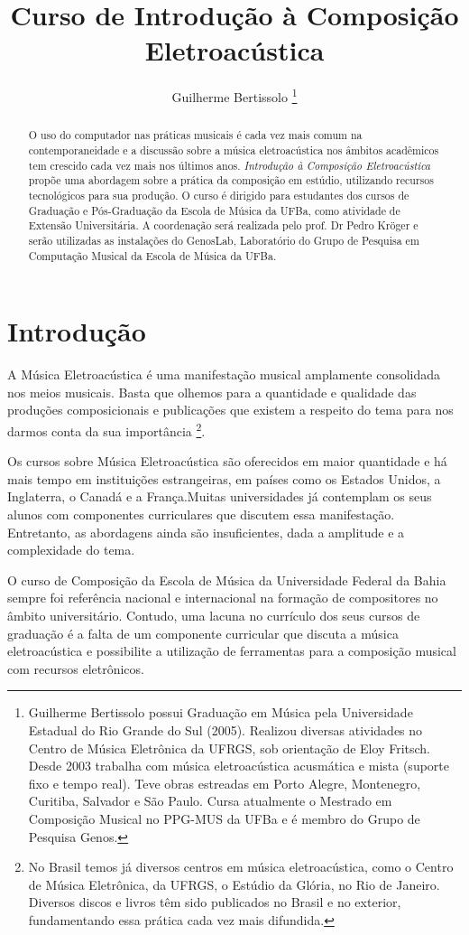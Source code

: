 \documentclass[12pt]{article}
\title{Curso de Introdução à Composição Eletroacústica}
\author{Guilherme Bertissolo \footnote{Guilherme Bertissolo possui Graduação em Música pela Universidade
Estadual do Rio Grande do Sul (2005). Realizou diversas atividades no
Centro de Música Eletrônica da UFRGS, sob orientação de Eloy
Fritsch. Desde 2003 trabalha com música eletroacústica acusmática e
mista (suporte fixo e tempo real). Teve obras estreadas em Porto
Alegre, Montenegro, Curitiba, Salvador e São Paulo. Cursa atualmente o
Mestrado em Composição Musical no PPG-MUS da UFBa e é membro do Grupo
de Pesquisa Genos.}}
\date{ }
\begin{document}
\maketitle
\tableofcontents

\begin{abstract}

  O uso do computador nas práticas musicais é cada vez mais comum na
  contemporaneidade e a discussão sobre a música eletroacústica nos
  âmbitos acadêmicos tem crescido cada vez mais nos últimos
  anos. \textit{Introdução à Composição Eletroacústica} propõe uma
  abordagem sobre a prática da composição em estúdio, utilizando
  recursos tecnológicos para sua produção. O curso é dirigido para
  estudantes dos cursos de Graduação e Pós-Graduação da Escola de
  Música da UFBa, como atividade de Extensão Universitária. A
  coordenação será realizada pelo prof. Dr Pedro Kröger e serão
  utilizadas as instalações do GenosLab, Laboratório do Grupo de
  Pesquisa em Computação Musical da Escola de Música da UFBa.

\end{abstract}

\section{Introdução}

A Música Eletroacústica é uma manifestação musical amplamente
consolidada nos meios musicais. Basta que olhemos para a quantidade e
qualidade das produções composicionais e publicações que existem a
respeito do tema para nos darmos conta da sua importância \footnote{No
  Brasil temos já diversos centros em música eletroacústica, como o
  Centro de Música Eletrônica, da UFRGS, o Estúdio da Glória, no Rio
  de Janeiro. Diversos discos e livros têm sido publicados no Brasil e
  no exterior, fundamentando essa prática cada vez mais
  difundida.}.

Os cursos sobre Música Eletroacústica são oferecidos em maior
quantidade e há mais tempo em instituições estrangeiras, em países
como os Estados Unidos, a Inglaterra, o Canadá e a França.Muitas
universidades já contemplam os seus alunos com componentes
curriculares que discutem essa manifestação. Entretanto, as abordagens
ainda são insuficientes, dada a amplitude e a complexidade do tema.

O curso de Composição da Escola de Música da Universidade Federal da
Bahia sempre foi referência nacional e internacional na formação de
compositores no âmbito universitário. Contudo, uma lacuna no currículo
dos seus cursos de graduação é a falta de um componente curricular que
discuta a música eletroacústica e possibilite a utilização de
ferramentas para a composição musical com recursos eletrônicos.
\end{document}
